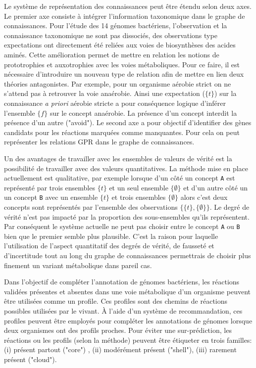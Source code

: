 \begin{refsegment}
Le système de représentation des connaissances peut être étendu selon deux axes. Le premier axe consiste à intégrer l'information taxonomique dans le graphe de connaissances. Pour l'étude des 14 génomes bactériens, l'observation et la connaissance taxonomique ne sont pas dissociés, des observations type expectations ont directement été reliées aux voies de biosynthèses des acides aminés. Cette amélioration permet de mettre en relation les notions de prototrophies et auxotrophies avec les voies métaboliques. Pour ce faire, il est nécessaire d'introduire un nouveau type de relation afin de mettre en lien deux théories antagonistes.  Par exemple, pour un organisme aérobie strict on ne s'attend pas à retrouver la voie anaérobie. Ainsi une expectation ($\{t\}$) sur la connaissance \textit{a priori} aérobie stricte a pour conséquence logique d'inférer l'ensemble $\{f\}$ sur le concept anaérobie. La présence d'un concept interdit la présence d'un autre ("avoid"). Le second axe a pour objectif d'identifier des gènes candidats pour les réactions marquées comme manquantes. Pour cela on peut représenter les relations \gls{GPR} dans le graphe de connaissances.

Un des avantages de travailler avec les ensembles de valeurs de vérité est la possibilité de travailler avec des valeurs quantitatives. La méthode mise en place actuellement est qualitative, par exemple lorsque d'un côté un concept \texttt{A} est représenté par trois ensembles $\{t\}$ et un seul ensemble $\{\emptyset\}$ et d'un autre côté un un concept \texttt{B} avec un ensemble $\{t\}$ et trois ensembles $\{\emptyset\}$ alors c'est deux concepts sont représentés par l'ensemble des observations $\{\{t\},\{\emptyset\}\}$. Le degré de vérité n'est pas impacté par la proportion des sous-ensembles qu'ils représentent. Par conséquent le système actuelle ne peut pas choisir entre le concept \texttt{A} ou \texttt{B} bien que le premier semble plus plausible. C'est la raison pour laquelle l'utilisation de l'aspect quantitatif des degrés de vérité, de fausseté et d'incertitude tout au long du graphe de connaissances permettrais de choisir plus finement  un variant métabolique dans pareil cas.

Dans l'objectif de compléter l'annotation de génomes bactériens, les réactions validées présentes et absentes dans une voie métabolique d'un organisme peuvent être utilisées comme un profile. Ces profiles sont des chemins de réactions possibles utilisées par le vivant. À l'aide d'un système de recommandation, ces profiles peuvent être employés pour compléter les annotations de génomes lorsque deux organismes ont des profils proches. Pour éviter une sur-prédiction, les réactions ou les profils (selon la méthode) peuvent être étiqueter en trois familles: (i) présent partout ("core") , (ii) modérément présent ("shell"), (iii) rarement présent ("cloud").



\end{refsegment}
